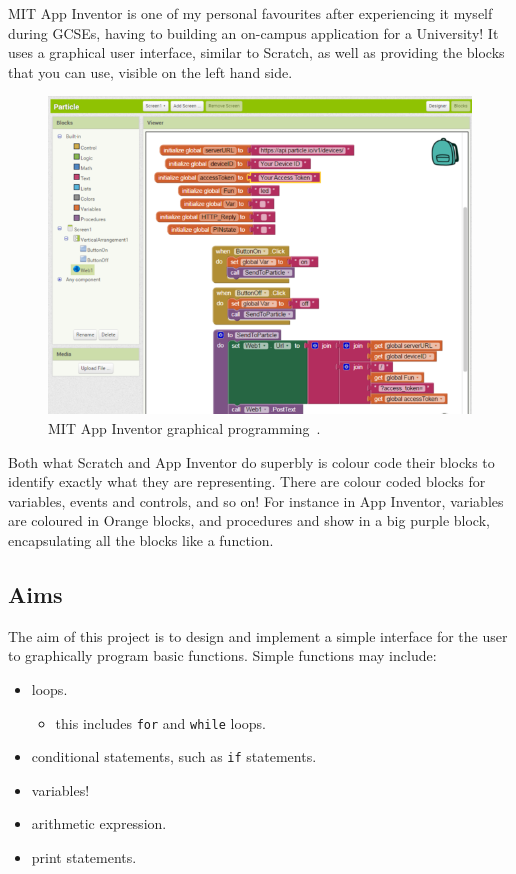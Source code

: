 \documentclass[a4paper, 12pt]{article}
\begin{document}
    \clearpage
    MIT App Inventor is one of my personal favourites after experiencing it myself during GCSEs, 
    having to building an on-campus application for a University! It uses a graphical user 
    interface, similar to Scratch, as well as providing the blocks that you can use, visible on 
    the left hand side.

    \begin{figure}[h]
        \centering
        \includegraphics[width=150mm]{app_inventor}
        \caption{MIT App Inventor graphical programming~\cite{adafruit}.}
    \end{figure}

    Both what Scratch and App Inventor do superbly is colour code their blocks to identify 
    exactly what they are representing. There are colour coded blocks for variables, events 
    and controls, and so on! For instance in App Inventor, variables are coloured in Orange 
    blocks, and procedures and show in a big purple block, encapsulating all the blocks like 
    a function.

        \subsection{Aims}
            The aim of this project is to design and implement a simple interface for the
            user to graphically program basic functions. Simple functions may include:

            \begin{itemize}
                \item loops.
                \begin{itemize}
                    \item this includes \texttt{for} and \texttt{while} loops.
                \end{itemize}
                \item conditional statements, such as \texttt{if} statements.
                \item variables!
                \item arithmetic expression.
                \item print statements.
            \end{itemize}
            
\end{document}
